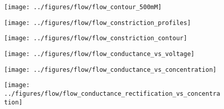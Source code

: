 \documentclass[journal=ancac3,manuscript=article,etalmode=truncate,maxauthors=0,layout=onecolumn]{achemso}
\begin{document}
\begin{figure*}[!htb]
  \centering
  \hspace{-2cm}
  \begin{minipage}[t]{5.5cm}
    \begin{subfigure}[t]{5.5cm}
      \centering
      \caption{}\vspace{-3mm}\label{fig:flow_contour}
      \texttt{[image: ../figures/flow/flow\_contour\_500mM]}
    \end{subfigure}
    \begin{subfigure}[t]{5.5cm}
      \addtocounter{subfigure}{1}
      \vspace{3mm}
      \centering
      \caption{}\vspace{-3mm}\label{fig:flow_constriction_profiles}
      \texttt{[image: ../figures/flow/flow\_constriction\_profiles]}
    \end{subfigure}
  \end{minipage}
  \begin{subfigure}[t]{4cm}
    \addtocounter{subfigure}{-2}
    \centering
    \caption{}\vspace{2mm}\label{fig:flow_constriction_contour}
    \texttt{[image: ../figures/flow/flow\_constriction\_contour]}
  \end{subfigure}
  \begin{minipage}[t]{4cm}
    \begin{subfigure}[t]{4cm}
      \addtocounter{subfigure}{1}
      \centering
      \caption{}\vspace{-5mm}\label{fig:flow_conductance_vs_voltage}
      \texttt{[image: ../figures/flow/flow\_conductance\_vs\_voltage]}
    \end{subfigure}
    \begin{subfigure}[t]{4cm}
      \vspace{2mm}
      \centering
      \caption{}\vspace{-5mm}\label{fig:flow_conductance_vs_concentration}
      \texttt{[image: ../figures/flow/flow\_conductance\_vs\_concentration]}
    \end{subfigure}
    \begin{subfigure}[t]{4cm}
      \vspace{2mm}
      \centering
      \caption{}\vspace{-5mm}\label{fig:flow_conductance_rectification_vs_concentration}
      \texttt{[image: ../figures/flow/flow\_conductance\_rectification\_vs\_concentration]}
    \end{subfigure}
  \end{minipage}
\centering


\end{figure*}
\end{document}
